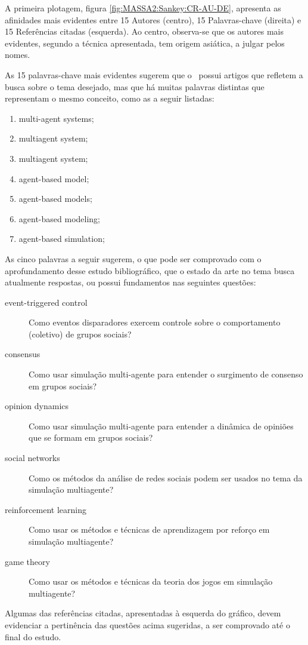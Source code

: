 A primeira plotagem, figura \ref{fig:MASSA2:Sankey:CR-AU-DE}, apresenta as afinidades mais evidentes entre 15 Autores (centro), 15 Palavras-chave (direita) e 15 Referências citadas (esquerda). Ao centro, observa-se que os autores mais evidentes, segundo a técnica apresentada, tem origem asiática, a julgar pelos nomes. 

As 15 palavras-chave mais evidentes sugerem que o \dataset\ possui artigos que refletem a busca sobre o tema desejado, mas que há muitas palavras distintas que representam o mesmo conceito, como as a seguir listadas:
\begin{enumerate}
    \item multi-agent systems;
    \item multiagent system;
    \item multiagent system; 
    \item agent-based model;  
    \item agent-based models;
    \item agent-based modeling;
    \item agent-based simulation;
\end{enumerate}

As cinco palavras a seguir sugerem, o que pode ser comprovado com o aprofundamento desse estudo bibliográfico, que o estado da arte no tema busca atualmente respostas, ou possui fundamentos nas seguintes questões:
\begin{description}
    \item [event-triggered control] Como eventos disparadores exercem  controle sobre o comportamento (coletivo) de grupos sociais?
    \item [consensus] Como usar simulação multi-agente para entender o surgimento de consenso em grupos sociais?
    \item [opinion dynamics] Como usar simulação multi-agente para entender a dinâmica de opiniões que se formam em grupos sociais?
    \item [social networks] Como os métodos da análise de redes sociais podem ser usados no tema da simulação multiagente?
    \item [reinforcement learning] Como usar os métodos e técnicas de aprendizagem por reforço em simulação multiagente?
    \item [game theory] Como usar os métodos e técnicas da teoria dos jogos em simulação multiagente?
\end{description}

Algumas das referências citadas, apresentadas à esquerda do gráfico, devem evidenciar a pertinência das questões acima sugeridas, a ser comprovado até o final do estudo. 

